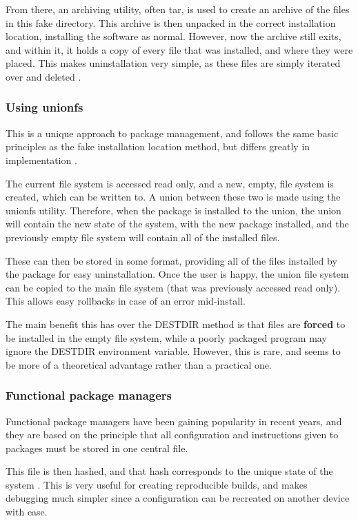\documentclass[10pt]{article}
\begin{document}
From there, an archiving utility, often tar, is used to create an archive of the files in this fake directory. This archive is then unpacked in the correct installation location, installing the software as normal. However, now the archive still exits, and within it, it holds a copy of every file that was installed, and where they were placed. This makes uninstallation very simple, as these files are simply iterated over and deleted \cite{qpkg}.

\subsubsection{Using unionfs}

This is a unique approach to package management, and follows the same basic principles as the fake installation location method, but differs greatly in implementation \cite{UnionfsLFS}.

The current file system is accessed read only, and a new, empty, file system is created, which can be written to. A union between these two is made using the unionfs utility. Therefore, when the package is installed to the union, the union will contain the new state of the system, with the new package installed, and the previously empty file system will contain all of the installed files.

These can then be stored in some format, providing all of the files installed by the package for easy uninstallation. Once the user is happy, the union file system can be copied to the main file system (that was previously accessed read only). This allows easy rollbacks in case of an error mid-install.

The main benefit this has over the DESTDIR method is that files are \textbf{forced} to be installed in the empty file system, while a poorly packaged program may ignore the DESTDIR environment variable. However, this is rare, and seems to be more of a theoretical advantage rather than a practical one.

\subsubsection{Functional package managers}

Functional package managers have been gaining popularity in recent years, and they are based on the principle that all configuration and instructions given to packages must be stored in one central file.

This file is then hashed, and that hash corresponds to the unique state of the system \cite{TryNix}. This is very useful for creating reproducible builds, and makes debugging much simpler since a configuration can be recreated on another device with ease.
\end{document}
